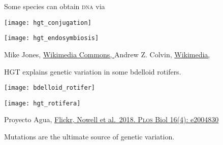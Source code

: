 \documentclass[t]{beamer}
\begin{document}
\begin{frame}[t]{Some species can obtain \textsc{dna} via }

\vspace{-\baselineskip}
\begin{multicols}{2}

\centering

\texttt{[image: hgt\_conjugation]}

\columnbreak

\texttt{[image: hgt\_endosymbiosis]}

\end{multicols}

\vfilll

\tiny Mike Jones, \href{https://commons.wikimedia.org/w/index.php?curid=1216076}{Wikimedia Commons, } \hfill Andrew Z. Colvin, \href{https://commons.wikimedia.org/w/index.php?curid=69411999}{Wikimedia, }

\end{frame}


\begin{frame}[t]{H\textsc{GT} explains genetic variation in some bdelloid rotifers.}

\begin{multicols}{2}

\texttt{[image: bdelloid\_rotifer]}

\columnbreak

\texttt{[image: hgt\_rotifera]}

\end{multicols}


\vfilll

\tiny Proyecto Agua, \href{https://www.flickr.com/photos/microagua/50464670972}{Flickr, } \hfill \href{https://doi.org/10.1371/journal.pbio.2004830}{Nowell et al.~2018. P\textsc{los} Biol 16(4): e2004830}

\end{frame}


{
\begin{frame}[b]{Mutations are the ultimate source of genetic variation.}
\end{frame}
}
%
\end{document}
